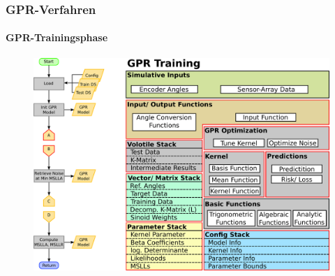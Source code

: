 \documentclass{beamer}
\begin{document}
\begin{frame}
\frametitle{GPR-Verfahren}
\framesubtitle{GPR-Trainingsphase}
\begin{figure}
	\begin{overprint}
		\centering\includegraphics[width=.8\linewidth]{images/GPR_Trainingsphase-5}
	\end{overprint}
\end{figure}
\end{frame}
\end{document}
